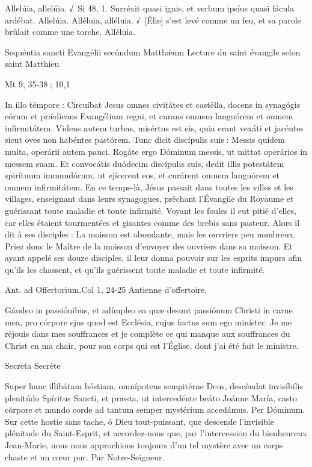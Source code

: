 \begin{paracol}{2}
Allelúia, allelúia. √~Si 48, 1. Surréxit quasi ignis, et verbum ipsíus quasi fácula ardébat. Allelúia.
\switchcolumn
Alléluia, alléluia. √~[Élie] s’est levé comme un feu, et sa parole brûlait comme une torche. Alléluia.
\switchcolumn*

Sequéntia sancti Evangélii secúndum Matthǽum
\switchcolumn
Lecture du saint évangile selon saint Matthieu
\switchcolumn*

Mt 9, 35-38 ; 10,1
\switchcolumn

\switchcolumn*

In illo témpore : Circuíbat Jesus  omnes civitátes et castélla, docens in synagógis eórum et prǽdicans Evangélium regni, et curans omnem languórem et omnem infirmitátem. Videns autem turbas, misértus est eis, quia erant vexáti et jacéntes sicut oves non habéntes pastórem. Tunc dicit discípulis suis : Messis quidem multa, operárii autem pauci. Rogáte ergo Dóminum messis, ut mittat operários in messem suam. Et convocátis duódecim discípulis suis, dedit illis potestátem spirítuum immundórum, ut ejícerent eos, et curárent omnem languórem et omnem infirmitátem.
\switchcolumn
En ce temps-là, Jésus passait dans toutes  les villes et les villages, enseignant dans leurs synagogues, prêchant l’Évangile du Royaume et guérissant toute maladie et toute infirmité. Voyant les foules il eut pitié d’elles, car elles étaient tourmentées et gisantes comme des brebis sans pasteur. Alors il dit à ses disciples : La moisson est abondante, mais les ouvriers peu nombreux. Priez donc le Maître de la moisson d’envoyer des ouvriers dans sa moisson. Et ayant appelé ses douze disciples, il leur donna pouvoir sur les esprits impurs afin qu’ils les chassent, et qu’ils guérissent toute maladie et toute infirmité.
\switchcolumn*

Ant. ad Offertorium.\hfill Col 1, 24-25
\switchcolumn
Antienne d’offertoire.
\switchcolumn*

Gáudeo in passiónibus, et adímpleo ea quæ desunt passiónum Christi in carne mea, pro córpore ejus quod est Ecclésia, cujus factus sum ego miníster.
\switchcolumn
Je me réjouis dans mes souffrances et je complète ce qui manque aux souffrances du Christ en ma chair, pour son corps qui est l’Église, dont j’ai été fait le ministre.
\switchcolumn*

Secreta
\switchcolumn
Secrète
\switchcolumn*

Super hanc illibátam hóstiam,  omnípotens sempitérne Deus, descéndat invisíbilis plenitúdo Spíritus Sancti, et præsta, ut intercedénte beáto Joánne María, casto córpore et mundo corde ad tantum semper mystérium accedámus. Per Dóminum.
\switchcolumn
Sur cette hostie sans tache, ô Dieu  tout-puissant, que descende l’invisible plénitude du Saint-Esprit, et accordez-nous que, par l’intercession du bienheureux Jean-Marie, nous nous approchions toujours d’un tel mystère avec un corps chaste et un cœur pur. Par Notre-Seigneur.
\switchcolumn*


\end{paracol}
